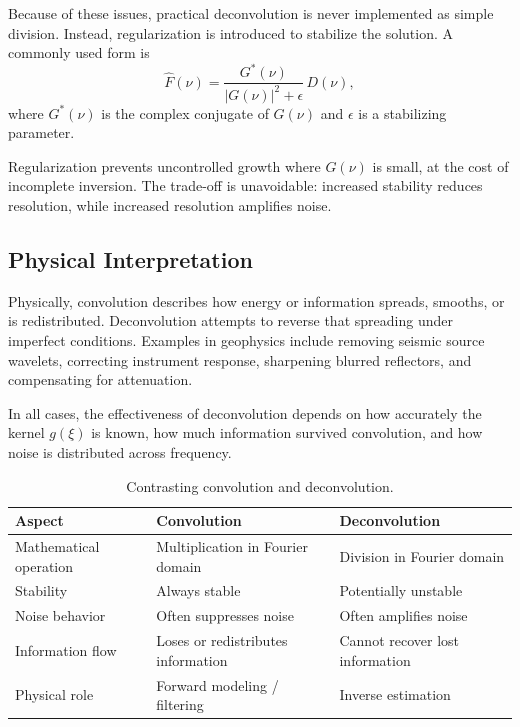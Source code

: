 Because of these issues, practical deconvolution is never implemented as simple division. Instead, regularization is introduced to stabilize the solution. A commonly used form is
\[
    \hat{F}(\nu) = \frac{G^*(\nu)}{|G(\nu)|^2 + \epsilon}\,D(\nu),
\]
where $G^*(\nu)$ is the complex conjugate of $G(\nu)$ and $\epsilon$ is a stabilizing parameter.

Regularization prevents uncontrolled growth where $G(\nu)$ is small, at the cost of incomplete inversion. The trade-off is unavoidable: increased stability reduces resolution, while increased resolution amplifies noise.

\subsection{Physical Interpretation}

Physically, convolution describes how energy or information spreads, smooths, or is redistributed. Deconvolution attempts to reverse that spreading under imperfect conditions. Examples in geophysics include removing seismic source wavelets, correcting instrument response, sharpening blurred reflectors, and compensating for attenuation.

In all cases, the effectiveness of deconvolution depends on how accurately the kernel $g(\xi)$ is known, how much information survived convolution, and how noise is distributed across frequency.

\begin{table}[hbt]
    \centering
    \caption{Contrasting convolution and deconvolution.}
    \label{tab:convolution}
    \begin{tabular}{@{}lll@{}}
        \toprule
        Aspect & Convolution & Deconvolution \\
        \midrule
        Mathematical operation & Multiplication in Fourier domain & Division in Fourier domain \\
        Stability & Always stable & Potentially unstable \\
        Noise behavior & Often suppresses noise & Often amplifies noise \\
        Information flow & Loses or redistributes information & Cannot recover lost information \\
        Physical role & Forward modeling / filtering & Inverse estimation \\
        \bottomrule
    \end{tabular}
\end{table}

